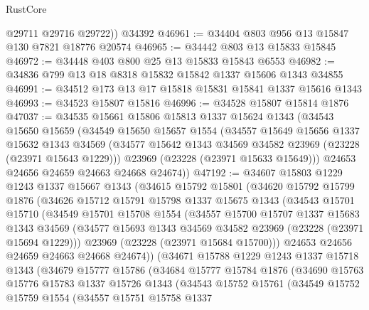 \begin{lexlean}{RustCore}
\begin{coremodule}
        @29711
        @29716
        @29722))
    @34392
@46961 := @34404 @803 @956 @13 @15847 @130 @7821 @18776 @20574
@46965 := @34442 @803 @13 @15833 @15845
@46972 := @34448 @403 @800 @25 @13 @15833 @15843 @6553
@46982 := @34836 @799 @13 @18 @8318 @15832 @15842 @1337 @15606 @1343 @34855
@46991 := @34512 @173 @13 @17 @15818 @15831 @15841 @1337 @15616 @1343
@46993 := @34523 @15807 @15816
@46996 := @34528 @15807 @15814 @1876
@47037 := @34535
    @15661
    @15806
    @15813
    @1337
    @15624
    @1343
    (@34543
      @15650
      @15659
      (@34549
        @15650
        @15657
        @1554
        (@34557
          @15649
          @15656
          @1337
          @15632
          @1343
          @34569
          (@34577 @15642 @1343 @34569 @34582 @23969 (@23228 (@23971 @15643 @1229)))
          @23969
          (@23228 (@23971 @15633 @15649)))
        @24653
        @24656
        @24659
        @24663
        @24668
        @24674))
@47192 := @34607
    @15803
    @1229
    @1243
    @1337
    @15667
    @1343
    (@34615
      @15792
      @15801
      (@34620
        @15792
        @15799
        @1876
        (@34626
          @15712
          @15791
          @15798
          @1337
          @15675
          @1343
          (@34543
            @15701
            @15710
            (@34549
              @15701
              @15708
              @1554
              (@34557
                @15700
                @15707
                @1337
                @15683
                @1343
                @34569
                (@34577 @15693 @1343 @34569 @34582 @23969 (@23228 (@23971 @15694 @1229)))
                @23969
                (@23228 (@23971 @15684 @15700)))
              @24653
              @24656
              @24659
              @24663
              @24668
              @24674))
          (@34671
            @15788
            @1229
            @1243
            @1337
            @15718
            @1343
            (@34679
              @15777
              @15786
              (@34684
                @15777
                @15784
                @1876
                (@34690
                  @15763
                  @15776
                  @15783
                  @1337
                  @15726
                  @1343
                  (@34543
                    @15752
                    @15761
                    (@34549
                      @15752
                      @15759
                      @1554
                      (@34557
                        @15751
                        @15758
                        @1337

\end{coremodule}
\end{lexlean}
